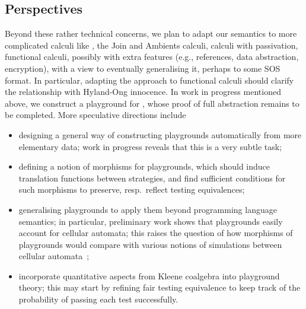 \documentclass{LMCS}
\theoremstyle{plain}\newtheorem{satz}[thm]{Satz}
\begin{document}
\subsection{Perspectives}
Beyond these rather technical concerns, we plan to adapt our semantics
to more complicated calculi like , the Join and Ambients calculi,
calculi with passivation, functional calculi, possibly with extra
features (e.g., references, data abstraction, encryption), with a view
to eventually generalising it, perhaps to some SOS format.  In
particular, adapting the approach to functional calculi should clarify
the relationship with Hyland-Ong innocence.  In work in progress
mentioned above, we construct a playground for , whose proof of
full abstraction remains to be completed. More speculative directions
include
\begin{itemize}
\item designing a general way of constructing playgrounds
  automatically from more elementary data; work in progress reveals
  that this is a very subtle task;
\item defining a notion of morphisms for playgrounds, which should
  induce translation functions between strategies, and find sufficient
  conditions for such morphisms to preserve, resp.\ reflect testing
  equivalences;
\item generalising playgrounds to apply them beyond programming
  language semantics; in particular, preliminary work shows that
  playgrounds easily account for cellular automata; this raises the
  question of how morphisms of playgrounds would compare with various
  notions of simulations between cellular
  automata~\cite{DBLP:journals/tcs/DelormeMOT11};
\item incorporate quantitative aspects from Kleene coalgebra into
  playground theory; this may start by refining fair testing
  equivalence to keep track of the probability of passing each test
  successfully.
\end{itemize}





\end{document}
